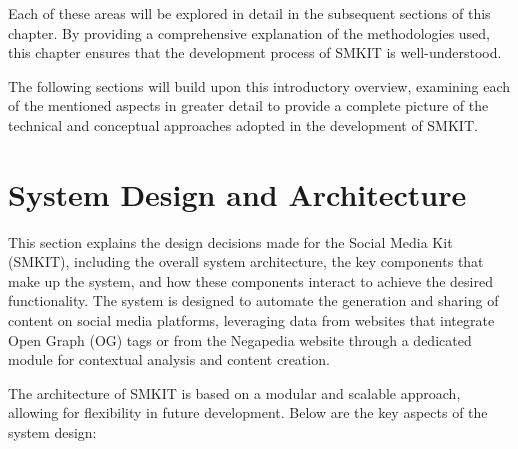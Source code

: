 Each of these areas will be explored in detail in the subsequent sections of this chapter. By providing a comprehensive explanation of the methodologies used, this chapter ensures that the development process of SMKIT is well-understood.

The following sections will build upon this introductory overview, examining each of the mentioned aspects in greater detail to provide a complete picture of the technical and conceptual approaches adopted in the development of SMKIT.


\section{System Design and Architecture}
\label{sec:system_design_architecture}
This section explains the design decisions made for the Social Media Kit (SMKIT), including the overall system architecture, the key components that make up the system, and how these components interact to achieve the desired functionality. The system is designed to automate the generation and sharing of content on social media platforms, leveraging data from websites that integrate Open Graph (OG) tags or from the Negapedia website through a dedicated module for contextual analysis and content creation.

The architecture of SMKIT is based on a modular and scalable approach, allowing for flexibility in future development. Below are the key aspects of the system design:

